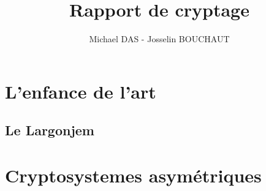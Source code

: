 \documentclass{report}
\title{Rapport de cryptage}
\author{Michael DAS - Josselin BOUCHAUT}
\begin{document}
\maketitle
\tableofcontents

\section{L'enfance de l'art}

\subsection{Le Largonjem}

\section{Cryptosystemes asymétriques}

\end{document}
